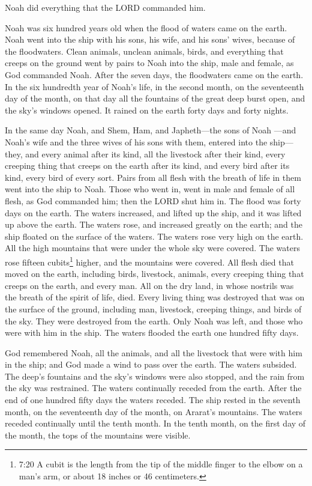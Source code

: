 \myverse{}Noah did everything that the LORD commanded him.

\myverse{}Noah was six hundred years old when the flood of waters came on the earth. \myverse{}Noah went into the ship with his sons, his wife, and his sons’ wives, because of the floodwaters. \myverse{}Clean animals, unclean animals, birds, and everything that creeps on the ground \myverse{}went by pairs to Noah into the ship, male and female, as God commanded Noah. \myverse{}After the seven days, the floodwaters came on the earth. \myverse{}In the six hundredth year of Noah’s life, in the second month, on the seventeenth day of the month, on that day all the fountains of the great deep burst open, and the sky’s windows opened. \myverse{}It rained on the earth forty days and forty nights.

\myverse{}In the same day Noah, and Shem, Ham, and Japheth—the sons of Noah —and Noah’s wife and the three wives of his sons with them, entered into the ship— \myverse{}they, and every animal after its kind, all the livestock after their kind, every creeping thing that creeps on the earth after its kind, and every bird after its kind, every bird of every sort. \myverse{}Pairs from all flesh with the breath of life in them went into the ship to Noah. \myverse{}Those who went in, went in male and female of all flesh, as God commanded him; then the LORD shut him in. \myverse{}The flood was forty days on the earth. The waters increased, and lifted up the ship, and it was lifted up above the earth. \myverse{}The waters rose, and increased greatly on the earth; and the ship floated on the surface of the waters. \myverse{}The waters rose very high on the earth. All the high mountains that were under the whole sky were covered. \myverse{}The waters rose fifteen cubits\footnote{7:20 A cubit is the length from the tip of the middle finger to the elbow on a man’s arm, or about 18 inches or 46 centimeters.} higher, and the mountains were covered. \myverse{}All flesh died that moved on the earth, including birds, livestock, animals, every creeping thing that creeps on the earth, and every man. \myverse{}All on the dry land, in whose nostrils was the breath of the spirit of life, died. \myverse{}Every living thing was destroyed that was on the surface of the ground, including man, livestock, creeping things, and birds of the sky. They were destroyed from the earth. Only Noah was left, and those who were with him in the ship. \myverse{}The waters flooded the earth one hundred fifty days.

\mychapter{}
\myverse*{}God remembered Noah, all the animals, and all the livestock that were with him in the ship; and God made a wind to pass over the earth. The waters subsided. \myverse{}The deep’s fountains and the sky’s windows were also stopped, and the rain from the sky was restrained. \myverse{}The waters continually receded from the earth. After the end of one hundred fifty days the waters receded. \myverse{}The ship rested in the seventh month, on the seventeenth day of the month, on Ararat’s mountains. \myverse{}The waters receded continually until the tenth month. In the tenth month, on the first day of the month, the tops of the mountains were visible.

